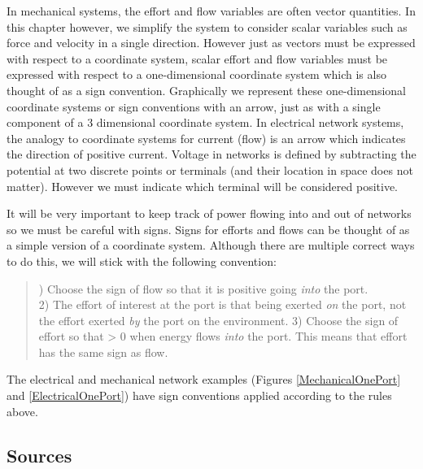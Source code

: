 In mechanical systems, the effort and flow variables are often vector quantities.  In this chapter however, we simplify the system to consider scalar variables such as force and velocity in a single direction.  However just as vectors must be expressed with respect to a coordinate system, scalar effort and flow variables must be expressed with respect to a one-dimensional coordinate system which is also thought of as a sign convention.   Graphically we represent these one-dimensional coordinate systems or sign conventions with an arrow, just as with a single component of a 3 dimensional coordinate system.  In electrical network systems, the analogy to coordinate systems for current (flow) is an arrow which indicates the direction of positive current.    Voltage in networks is defined by subtracting the potential at two discrete points or terminals (and their location in space does not matter).  However we must indicate which terminal will be considered positive. 	%

It will be very important to keep track of power flowing into and out of networks so we must be careful with signs.   Signs for efforts and flows can be thought of as a simple version of a coordinate system.   Although there are multiple correct ways to do this, we will stick with the following convention:	%

\begin{quotation}
) Choose the sign of flow so that it is positive going {\it into} the port. \\
2) The effort of interest at the port is that being exerted {\it on} the port, not the effort exerted {\it by} the port on the environment.
3) Choose the sign of effort so that
\bq
\ef \times \fl > 0
\eq
when energy flows {\it into} the port.  This means that effort has the same sign as flow.
\end{quotation}

The electrical and mechanical network examples (Figures \ref{MechanicalOnePort} and \ref{ElectricalOnePort}) have sign conventions applied according to the rules above. 	%




\subsection{Sources}


